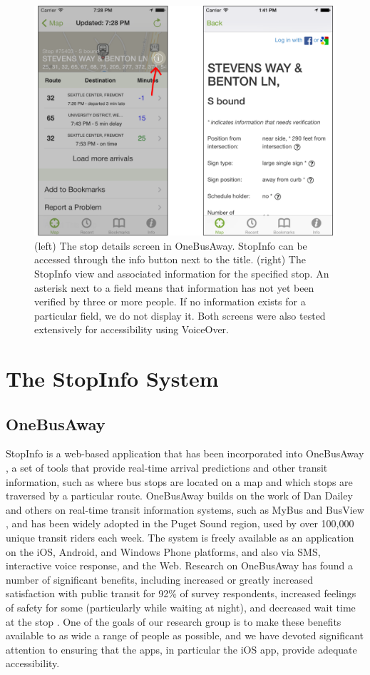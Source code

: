 \label{sec:background}
\begin{figure}[t]
\centering
\includegraphics[width=.60\textwidth]{StopInfoAppScreen.pdf}
\caption{(left) The stop details screen in OneBusAway. StopInfo can be
accessed through the info button next to the title. (right) The StopInfo
view and associated information for the specified stop. An asterisk
next to a field means that information has not yet been verified by three 
or more people. If no information exists for a particular field, we do not
display it.  Both screens were also tested extensively for
accessibility using VoiceOver.}
\label{fig:app-screen}
\end{figure} 

\section{The StopInfo System}

\subsection{OneBusAway}
StopInfo is a web-based application that has been incorporated into OneBusAway \cite{ferris-phd, watkins-phd},
a set of tools that provide real-time arrival
predictions and other transit information, such as where bus stops
are located on a map and which stops are traversed by a particular
route. OneBusAway builds on the work of Dan Dailey and others on real-time transit 
information systems, such as MyBus and BusView \cite{maclean-trb-2002}, and has been widely 
adopted in the Puget Sound region, used by over 100,000 unique transit riders each week. The system is freely available as an application on the iOS, Android, and 
Windows Phone platforms, and also via SMS, interactive voice response, and the 
Web. Research on OneBusAway has found a number of significant 
benefits, including increased or greatly increased satisfaction with public 
transit for 92\% of survey respondents, increased feelings of safety for some
(particularly while waiting at night), and decreased wait time at the stop
\cite{watkins-transportation-research-2011}.  One of the goals of our research 
group is to make these benefits available to as wide a range of people 
as possible, and we have devoted significant attention to ensuring that the
apps, in particular the iOS app, provide adequate accessibility.

